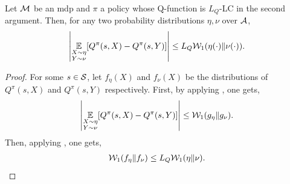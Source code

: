 \begin{prop}
\label{pp:expected_q_bound}
    Let $\mathcal{M}$ be an \gls{mdp} and $\pi$ a policy whose Q-function is $L_{Q}$-LC in the second argument.
    Then, for any two probability distributions $\eta,\nu$ over $\mathcal{A}$, 
    \begin{align*}
        \left\vert \operatorname*{\mathbb{E}}_{\substack{X\sim \eta\\Y\sim \nu}}[Q^{\pi}(s,X)-Q^{\pi}(s,Y)] \right\vert 
        \leq L_{Q} \mathcal{W}_{1}(\eta(\cdot)\Vert\nu(\cdot)).
    \end{align*}
\end{prop}
\begin{proof}
    For some $s\in\mathcal{S}$, let $f_{\eta}(X)$ and $f_{\nu}(X)$ be the distributions of $Q^{\pi}(s,X)$ and $Q^{\pi}(s,Y)$ respectively.
    First, by applying , one gets,
    \begin{align*}
        \left\vert \operatorname*{\mathbb{E}}_{\substack{X\sim \eta\\Y\sim \nu}}[Q^{\pi}(s,X)-Q^{\pi}(s,Y)] \right\vert 
        \leq  \mathcal{W}_{1}(g_{\eta}\Vert g_{\nu}).
    \end{align*}
    Then, applying , one gets,
    \begin{align*}
         \mathcal{W}_{1}(f_{\eta}\Vert f_{\nu})
         \leq L_{Q} \mathcal{W}_{1}(\eta\Vert \nu).
    \end{align*}
\end{proof}


